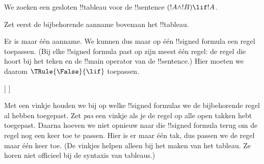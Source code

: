 \documentclass[openany]{memoir}
\begin{document}
\begingroup
\def\olfilename{OLP-0103}
\def\olfilepath{content/first-order-logic/tableaux/}
\hypertarget{unit-OLP-0103}{}



      {}
      {}


\begin{ex}
We zoeken een gesloten !!{tableau} voor de !!{sentence}
$(!A \land !B) \lif !A$.

Zet eerst de bijbehorende aanname bovenaan het !!{tableau}.
\begin{oltableau}
  [\sFmla{\False}{(\formula{A} \land \formula{B}) \lif \formula{A}},
    just = \TAss]
\end{oltableau}

Er is maar één aanname. We kunnen dus maar op één !!{signed formula}
een regel toepassen. (Bij elke !!{signed formula} past op zijn meest één
regel: de regel die hoort bij het teken en de !!{main operator} van de
!!{sentence}.) Hier moeten we daarom $\TRule{\False}{\lif}$ toepassen.
\begin{oltableau}
  [\sFmla{\False}{(\formula{A} \land \formula{B}) \lif \formula{A}},
    checked, just = \TAss
    [\sFmla{\True}{\formula{A} \land \formula{B}},
      just={\TRule{\False}{\lif}[1]}
      [\sFmla{\False}{\formula{A}}, just={\TRule{\False}{\lif}[1]}]
    ]
  ]
\end{oltableau}
Met een vinkje houden we bij op welke !!{signed formula}s we de
bijbehorende regel al hebben toegepast. Zet \emph{pas} een vinkje als je de
regel op alle open takken hebt toegepast. Daarna hoeven we niet opnieuw
naar die !!{signed formula} terug om de regel nog een keer toe te
passen. Hier is er maar één tak, dus passen we de regel maar één keer
toe. (De vinkjes helpen alleen bij het maken van het tableau. Ze horen
niet officieel bij de syntaxis van tableaus.)


\end{ex}
\end{document}
